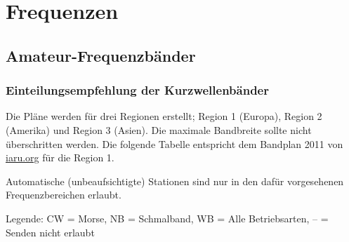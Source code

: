
\chapter{Frequenzen}
\section{Amateur-Frequenzbänder}
\subsection{Einteilungsempfehlung der Kurzwellenbänder}
Die Pläne werden für drei Regionen erstellt; Region 1 (Europa), Region 2 (Amerika) und Region 3 (Asien). Die maximale Bandbreite sollte nicht überschritten werden. Die folgende Tabelle entspricht dem Bandplan 2011 von \href{http://www.iaru.org/region-1.html}{iaru.org} für die Region 1.

Automatische (unbeaufsichtigte) Stationen sind nur in den dafür vorgesehenen Frequenzbereichen erlaubt.

Legende: CW = Morse, NB = Schmalband, WB = Alle Betriebsarten, -- =  Senden nicht erlaubt

